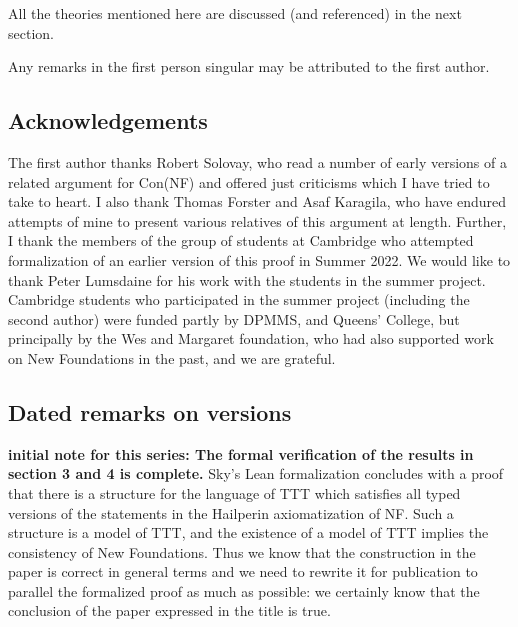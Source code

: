\documentclass[112pt]{article}
\theoremstyle{definition}
\theoremstyle{remark}
\begin{document}
All the theories mentioned here are discussed (and referenced) in the next section.

Any remarks in the first person singular may be attributed to the first author.

\subsection{Acknowledgements}

The first author thanks Robert Solovay, who read a number of early versions of a related argument for Con(NF) and offered just criticisms which I have tried to take to heart.  I also thank Thomas Forster and Asaf Karagila, who have endured attempts of mine to present various relatives of this argument at length.  Further, I thank the members of the group of students at Cambridge who attempted formalization of an earlier version of this proof in Summer 2022.  We would like to thank Peter Lumsdaine for his work with the students in the summer project.   Cambridge students who participated in the summer project (including the second author) were funded partly by DPMMS, and Queens' College, but principally by the Wes and Margaret foundation, who had also supported work on New Foundations in the past, and we are grateful.


\subsection{Dated remarks on versions}

{\bf initial note for this series:  The formal verification of the results in section 3 and 4 is complete.} Sky's Lean formalization concludes with a proof that there is a structure for the language of TTT which satisfies all typed versions of the statements
in the Hailperin axiomatization of NF.  Such a structure is a model of TTT, and the existence of a model of TTT implies the consistency of New Foundations.  Thus we know that the construction in the paper is correct in general terms and we need to rewrite it for publication to parallel the formalized proof as much as possible:  we certainly know that the conclusion of the paper expressed in the title is true.
\end{document}

